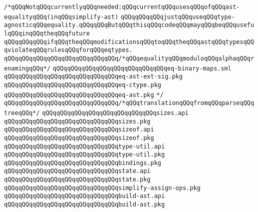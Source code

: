 \verb|/*qQQqNotqQQqcurrentlyqQQqneeded:qQQqcurrentqQQqusesqQQqofqQQqast-equalityqQQq(inqQQqsimplify-ast)|\newline
\verb|qQQqqQQqqQQqjustqQQquseqQQqtype-agnosticqQQqequality.qQQqqQQqButqQQqthisqQQqcodeqQQqmayqQQqbeqQQqusefulqQQqinqQQqtheqQQqfuture|\newline
\verb|qQQqqQQqqQQqifqQQqtheqQQqmodificationsqQQqtoqQQqtheqQQqastqQQqtypesqQQqviolateqQQqrulesqQQqforqQQqeqtypes.|\newline
\verb|qQQqqQQqqQQqqQQqqQQqqQQqqQQqqQQq/*qQQqequalityqQQqmoduloqQQqalphaqQQqrenamingqQQq*/|\newline
\verb|qQQqqQQqqQQqqQQqqQQqqQQqqQQqqQQqeq-binary-maps.sml|\newline
\verb|qQQqqQQqqQQqqQQqqQQqqQQqqQQqqQQqeq-ast-ext-sig.pkg|\newline
\verb|qQQqqQQqqQQqqQQqqQQqqQQqqQQqqQQqeq-ctype.pkg|\newline
\verb|qQQqqQQqqQQqqQQqqQQqqQQqqQQqqQQqeq-ast.pkg|\newline
\verb|*/|\newline
\verb|qQQqqQQqqQQqqQQqqQQqqQQqqQQqqQQq/*qQQqtranslationqQQqfromqQQqparseqQQqtreeqQQq*/|\newline
\verb|qQQqqQQqqQQqqQQqqQQqqQQqqQQqqQQqsizes.api|\newline
\verb|qQQqqQQqqQQqqQQqqQQqqQQqqQQqqQQqsizes.pkg|\newline
\verb|qQQqqQQqqQQqqQQqqQQqqQQqqQQqqQQqsizeof.api|\newline
\verb|qQQqqQQqqQQqqQQqqQQqqQQqqQQqqQQqsizeof.pkg|\newline
\newline
\verb|qQQqqQQqqQQqqQQqqQQqqQQqqQQqqQQqtype-util.api|\newline
\verb|qQQqqQQqqQQqqQQqqQQqqQQqqQQqqQQqtype-util.pkg|\newline
\newline
\verb|qQQqqQQqqQQqqQQqqQQqqQQqqQQqqQQqbindings.pkg|\newline
\newline
\verb|qQQqqQQqqQQqqQQqqQQqqQQqqQQqqQQqstate.api|\newline
\verb|qQQqqQQqqQQqqQQqqQQqqQQqqQQqqQQqstate.pkg|\newline
\newline
\verb|qQQqqQQqqQQqqQQqqQQqqQQqqQQqqQQqsimplify-assign-ops.pkg|\newline
\verb|qQQqqQQqqQQqqQQqqQQqqQQqqQQqqQQqbuild-ast.api|\newline
\verb|qQQqqQQqqQQqqQQqqQQqqQQqqQQqqQQqbuild-ast.pkg|\newline
